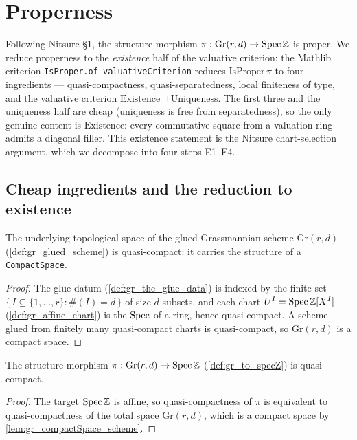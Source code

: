 \section{Properness}
\label{sec:gr_proper}

Following Nitsure \S 1, the structure morphism \(\pi : \mathrm{Gr}(r,d) \to \operatorname{Spec}
\mathbb{Z}\) is proper. We reduce properness to the \emph{existence} half of the
valuative criterion: the Mathlib criterion \texttt{IsProper.of\_valuativeCriterion}
reduces \(\mathrm{IsProper}\,\pi\) to four ingredients --- quasi-compactness,
quasi-separatedness, local finiteness of type, and the valuative criterion
\(\mathrm{Existence} \sqcap \mathrm{Uniqueness}\). The first three and the
uniqueness half are cheap (uniqueness is free from separatedness), so the only
genuine content is \(\mathrm{Existence}\): every commutative square from a
valuation ring admits a diagonal filler. This existence statement is the Nitsure
chart-selection argument, which we decompose into four steps E1--E4.

\subsection*{Cheap ingredients and the reduction to existence}

\begin{lemma}\leanok
  \label{lem:gr_compactSpace_scheme}
  The underlying topological space of the glued Grassmannian scheme
  \(\mathrm{Gr}(r,d)\) (\cref{def:gr_glued_scheme}) is quasi-compact: it carries the
  structure of a \texttt{CompactSpace}.
\end{lemma}
\begin{proof}
  \leanok
  The glue datum (\cref{def:gr_the_glue_data}) is indexed by the finite set
  \(\{\, I \subseteq \{1,\dots,r\} : \#(I) = d \,\}\) of size-\(d\) subsets, and
  each chart \(U^I = \operatorname{Spec} \mathbb{Z}[X^I]\) (\cref{def:gr_affine_chart}) is the
  \(\operatorname{Spec}\) of a ring, hence quasi-compact. A scheme glued from finitely many
  quasi-compact charts is quasi-compact, so \(\mathrm{Gr}(r,d)\) is a compact
  space.
\end{proof}

\begin{lemma}\leanok
  \label{lem:gr_quasiCompact_toSpecZ}
  The structure morphism \(\pi : \mathrm{Gr}(r,d) \to \operatorname{Spec} \mathbb{Z}\)
  (\cref{def:gr_to_specZ}) is quasi-compact.
\end{lemma}
\begin{proof}
  \leanok
  The target \(\operatorname{Spec} \mathbb{Z}\) is affine, so quasi-compactness of \(\pi\) is
  equivalent to quasi-compactness of the total space \(\mathrm{Gr}(r,d)\), which is
  a compact space by \cref{lem:gr_compactSpace_scheme}.
\end{proof}

